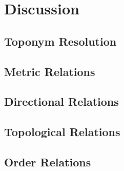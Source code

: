 \section{Discussion}
\label{section:discussion}

\subsection{Toponym Resolution}



\subsection{Metric Relations}




\subsection{Directional Relations}



\subsection{Topological Relations}



\subsection{Order Relations}
